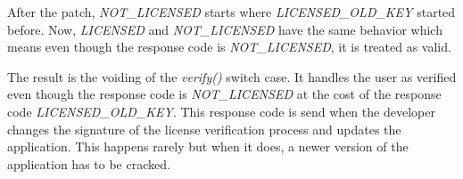 After the patch, \textit{NOT\_LICENSED} starts where \textit{LICENSED\_OLD\_KEY} started before.
Now, \textit{LICENSED} and \textit{NOT\_LICENSED} have the same behavior which means even though the response code is \textit{NOT\_LICENSED}, it is treated as valid.
\newline

The result is the voiding of the \textit{verify()} switch case.
It handles the user as verified even though the response code is \textit{NOT\_LICENSED} at the cost of the response code \textit{LICENSED\_OLD\_KEY}.
This response code is send when the developer changes the signature of the license verification process and updates the application.
This happens rarely but when it does, a newer version of the application has to be cracked.

